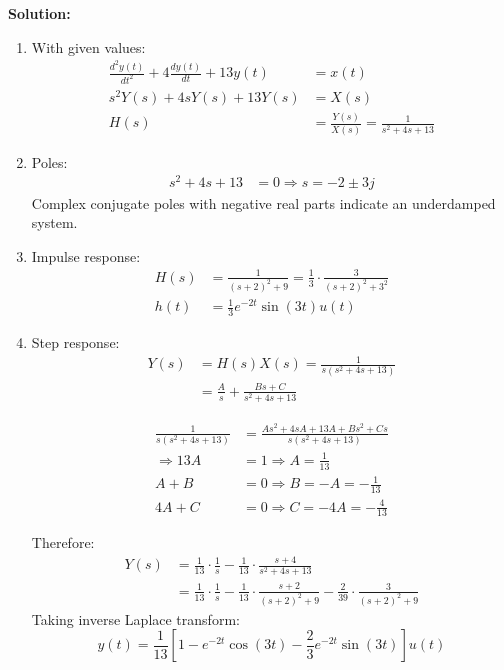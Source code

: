 \documentclass{article}
\begin{document}
\textbf{Solution:}
\begin{enumerate}[label=(\alph*)]
    \item With given values:
    \begin{align*}
        \frac{d^2y(t)}{dt^2} + 4\frac{dy(t)}{dt} + 13y(t) &= x(t) \\
        s^2Y(s) + 4sY(s) + 13Y(s) &= X(s) \\
        H(s) &= \frac{Y(s)}{X(s)} = \frac{1}{s^2 + 4s + 13}
    \end{align*}
    
    \item Poles:
    \begin{align*}
        s^2 + 4s + 13 &= 0 \Rightarrow s = -2 \pm 3j
    \end{align*}
    Complex conjugate poles with negative real parts indicate an underdamped system.
    
    \item Impulse response:
    \begin{align*}
        H(s) &= \frac{1}{(s + 2)^2 + 9} = \frac{1}{3} \cdot \frac{3}{(s + 2)^2 + 3^2} \\
        h(t) &= \frac{1}{3}e^{-2t}\sin(3t)u(t)
    \end{align*}
    
    \item Step response:
    \begin{align*}
        Y(s) &= H(s)X(s) = \frac{1}{s(s^2 + 4s + 13)} \\
        &= \frac{A}{s} + \frac{Bs + C}{s^2 + 4s + 13}
    \end{align*}

\begin{align*}
 \frac{1}{s(s^2 + 4s + 13)}  & = \frac{As^2 + 4sA + 13A + Bs^2 + Cs}{s(s^2 + 4s + 13)}\\
 \Rightarrow 13A & = 1\Rightarrow A = \frac{1}{13}\\
 A + B & = 0 \Rightarrow B = -A = -\frac{1}{13}\\
 4A + C & = 0 \Rightarrow C = -4A = -\frac{4}{13}
\end{align*}

    Therefore:
    \begin{align*}
        Y(s) &= \frac{1}{13} \cdot \frac{1}{s} - \frac{1}{13} \cdot \frac{s + 4}{s^2 + 4s + 13} \\
        &= \frac{1}{13} \cdot \frac{1}{s} - \frac{1}{13} \cdot \frac{s + 2}{(s + 2)^2 + 9} - \frac{2}{39} \cdot \frac{3}{(s + 2)^2 + 9}
    \end{align*}
    Taking inverse Laplace transform:
    \[ y(t) = \frac{1}{13}[1 - e^{-2t}\cos(3t) - \frac{2}{3}e^{-2t}\sin(3t)]u(t) \]
\end{enumerate}
\end{document}
